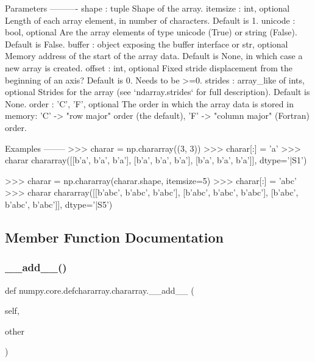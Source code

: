 \begin{DoxyVerb}
Parameters
----------
shape : tuple
    Shape of the array.
itemsize : int, optional
    Length of each array element, in number of characters. Default is 1.
unicode : bool, optional
    Are the array elements of type unicode (True) or string (False).
    Default is False.
buffer : object exposing the buffer interface or str, optional
    Memory address of the start of the array data.  Default is None,
    in which case a new array is created.
offset : int, optional
    Fixed stride displacement from the beginning of an axis?
    Default is 0. Needs to be >=0.
strides : array_like of ints, optional
    Strides for the array (see `ndarray.strides` for full description).
    Default is None.
order : {'C', 'F'}, optional
    The order in which the array data is stored in memory: 'C' ->
    "row major" order (the default), 'F' -> "column major"
    (Fortran) order.

Examples
--------
>>> charar = np.chararray((3, 3))
>>> charar[:] = 'a'
>>> charar
chararray([[b'a', b'a', b'a'],
           [b'a', b'a', b'a'],
           [b'a', b'a', b'a']], dtype='|S1')

>>> charar = np.chararray(charar.shape, itemsize=5)
>>> charar[:] = 'abc'
>>> charar
chararray([[b'abc', b'abc', b'abc'],
           [b'abc', b'abc', b'abc'],
           [b'abc', b'abc', b'abc']], dtype='|S5')\end{DoxyVerb}
 

\subsection{Member Function Documentation}
\mbox{\label{classnumpy_1_1core_1_1defchararray_1_1chararray_ac648ad17757631ef010d4683b24cf110}} 
\subsubsection{\texorpdfstring{\+\_\+\+\_\+add\+\_\+\+\_\+()}{\_\_add\_\_()}}
{\footnotesize\ttfamily def numpy.\+core.\+defchararray.\+chararray.\+\_\+\+\_\+add\+\_\+\+\_\+ (\begin{DoxyParamCaption}\item[{}]{self,  }\item[{}]{other }\end{DoxyParamCaption})}

